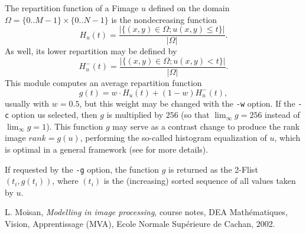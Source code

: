 The repartition function of a Fimage $u$ 
defined on the domain $\Omega=\{0..M-1\}\times\{0..N-1\}$ is
the nondecreasing function 
$$H_u(t) = \frac{|\{(x,y) \in \Omega;u(x,y)\leq t\}|}{|\Omega|}.$$
As well, its lower repartition may be defined by
$$H^-_u(t) = \frac{|\{(x,y) \in \Omega;u(x,y)< t\}|}{|\Omega|}.$$
This module computes an average repartition function
$$g(t) = w\cdot H_u(t)+ (1-w)H^-_u(t),$$
usually with $w=0.5$, but this weight may be changed with the \verb+-w+
option. If the \verb+-c+ option us selected, then $g$ is multiplied
by $256$ (so that $\lim_\infty g=256$ instead of $\lim_\infty g=1$). 
This function $g$ may serve as a contrast change to produce
the rank image $rank=g(u)$, performing the so-called histogram equalization
of $u$, which is optimal in a general framework
(see \cite{moisan} for more details). 

If requested by the \verb+-g+ option, the function $g$ is returned
as the 2-Flist $(t_i,g(t_i))$, where $(t_i)$ is the (increasing) sorted
sequence of all values taken by $u$.

\begin{thebibliography}{1}

L. Moisan, {\it Modelling in image processing},
course notes, DEA Math\'ematiques, Vision, Apprentissage (MVA),
Ecole Normale Sup\'erieure de Cachan, 2002.

\end{thebibliography}
